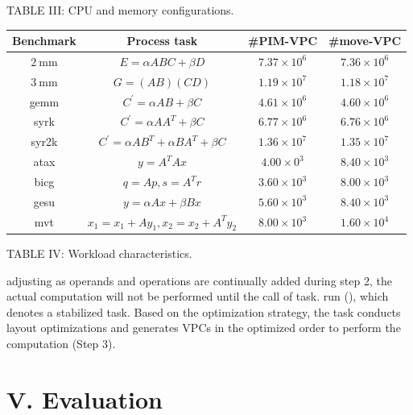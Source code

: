 \documentclass[10pt]{article}
\begin{document}
TABLE III: CPU and memory configurations.

\begin{center}
\begin{tabular}{|cccc|}
\hline
Benchmark & Process task & \#PIM-VPC & \#move-VPC \\
\hline
$2 \mathrm{~mm}$ & $E=\alpha A B C+\beta D$ & $7.37 \times 10^{6}$ & $7.36 \times 10^{6}$ \\
$3 \mathrm{~mm}$ & $G=(A B)(C D)$ & $1.19 \times 10^{7}$ & $1.18 \times 10^{7}$ \\
gemm & $C^{\prime}=\alpha A B+\beta C$ & $4.61 \times 10^{6}$ & $4.60 \times 10^{6}$ \\
syrk & $C^{\prime}=\alpha A A^{T}+\beta C$ & $6.77 \times 10^{6}$ & $6.76 \times 10^{6}$ \\
syr2k & $C^{\prime}=\alpha A B^{T}+\alpha B A^{T}+\beta C$ & $1.36 \times 10^{7}$ & $1.35 \times 10^{7}$ \\
atax & $y=A^{T} A x$ & $4.00 \times 0^{3}$ & $8.40 \times 10^{3}$ \\
bicg & $q=A p, s=A^{T} r$ & $3.60 \times 10^{3}$ & $8.00 \times 10^{3}$ \\
gesu & $y=\alpha A x+\beta B x$ & $5.60 \times 10^{3}$ & $8.40 \times 10^{3}$ \\
mvt & $x_{1}=x_{1}+A y_{1}, x_{2}=x_{2}+A^{T} y_{2}$ & $8.00 \times 10^{3}$ & $1.60 \times 10^{4}$ \\
\hline
\end{tabular}
\end{center}

TABLE IV: Workload characteristics.

adjusting as operands and operations are continually added during step 2, the actual computation will not be performed until the call of task. run (), which denotes a stabilized task. Based on the optimization strategy, the task conducts layout optimizations and generates VPCs in the optimized order to perform the computation (Step 3).

\section*{V. Evaluation}
\end{document}

